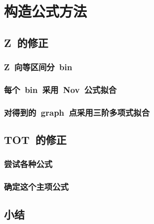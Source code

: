 \chapter{构造公式方法}
\section{Z~的修正}
\subsection{Z~向等区间分~bin~}
\subsection{每个~bin~采用~Nov~公式拟合}
\subsection{对得到的~graph~点采用三阶多项式拟合}
\section{TOT~的修正}
\subsection{尝试各种公式}
\subsection{确定这个主项公式}
\section{小结}









